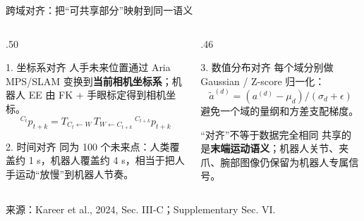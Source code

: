 \documentclass[aspectratio=169,10pt]{beamer}
\newcommand{\src}[1]{\vfill{\fontsize{5.8}{6.8}\selectfont\color{CUHKMidGray}来源：#1}}
\begin{document}
\begin{frame}{跨域对齐：把“可共享部分”映射到同一语义}
  \scriptsize
  \begin{columns}[T,onlytextwidth]
    \begin{column}{.50\textwidth}
      \begin{block}{1. 坐标系对齐}
        人手未来位置通过 Aria MPS/SLAM 变换到\textbf{当前相机坐标系}；机器人 EE 由 FK + 手眼标定得到相机坐标。
        \[
          {}^{C_t}\!p_{t+k}=T_{C_t\leftarrow W}\,T_{W\leftarrow C_{t+k}}\,{}^{C_{t+k}}\!p_{t+k}
        \]
      \end{block}
      \begin{block}{2. 时间对齐}
        同为 100 个未来点：人类覆盖约 1 s，机器人覆盖约 4 s，相当于把人手运动“放慢”到机器人节奏。
      \end{block}
    \end{column}
    \begin{column}{.46\textwidth}
      \begin{block}{3. 数值分布对齐}
        每个域分别做 Gaussian / Z-score 归一化：
        \[
          \tilde a^{(d)}=(a^{(d)}-\mu_d)/(\sigma_d+\epsilon)
        \]
        避免一个域的量纲和方差支配梯度。
      \end{block}
      \begin{alertblock}{“对齐”不等于数据完全相同}
        共享的是\textbf{末端运动语义}；机器人关节、夹爪、腕部图像仍保留为机器人专属信号。
      \end{alertblock}
    \end{column}
  \end{columns}
  \src{Kareer et al., 2024, Sec. III-C；Supplementary Sec. VI.}
\end{frame}
\end{document}
